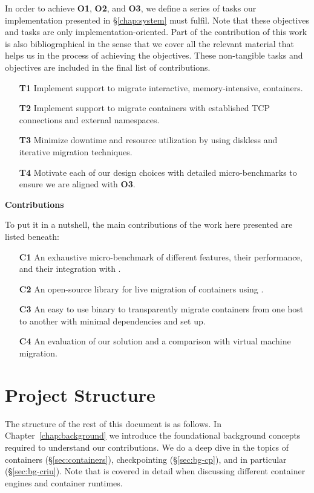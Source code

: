 In order to achieve \textbf{O1}, \textbf{O2}, and \textbf{O3}, we define a series of tasks our implementation presented in \S\ref{chap:system} must fulfil.
Note that these objectives and tasks are only implementation-oriented.
Part of the contribution of this work is also bibliographical in the sense that we cover all the relevant material that helps us in the process of achieving the objectives.
These non-tangible tasks and objectives are included in the final list of contributions.
\begin{itemize}
    \item[\textbf{T1}] Implement support to migrate interactive, memory-intensive, containers.
    \item[\textbf{T2}] Implement support to migrate containers with established TCP connections and external namespaces.
    \item[\textbf{T3}] Minimize downtime and resource utilization by using diskless and iterative migration techniques.
    \item[\textbf{T4}] Motivate each of our design choices with detailed micro-benchmarks to ensure we are aligned with \textbf{O3}.
\end{itemize}

\textbf{Contributions}

To put it in a nutshell, the main contributions of the work here presented are listed beneath:
\begin{itemize}
    \item[\textbf{C1}] An exhaustive micro-benchmark of different \criu features, their performance, and their integration with \runc.
    \item[\textbf{C2}] An open-source library for live migration of \runc containers using \criu.
    \item[\textbf{C3}] An easy to use binary to transparently migrate containers from one host to another with minimal dependencies and set up.
    \item[\textbf{C4}] An evaluation of our solution and a comparison with virtual machine migration.
\end{itemize}

\section{Project Structure}

The structure of the rest of this document is as follows.
In Chapter~\ref{chap:background} we introduce the foundational background concepts required to understand our contributions.
We do a deep dive in the topics of containers (\S\ref{sec:containers}), checkpointing (\S\ref{sec:bg-cp}), and \criu in particular (\S\ref{sec:bg-criu}).
Note that \runc is covered in detail when discussing different container engines and container runtimes.

